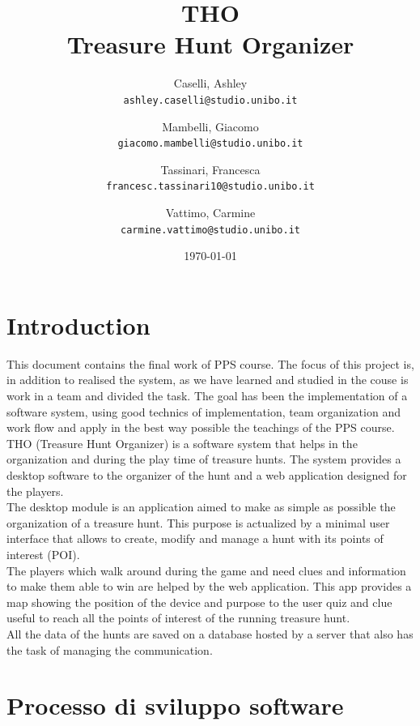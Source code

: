 \documentclass[12pt, english]{report}
\title{\textbf{THO\\Treasure Hunt Organizer}}
\author{
	Caselli, Ashley\\
	\texttt{ashley.caselli@studio.unibo.it}
	\and
	Mambelli, Giacomo\\
	\texttt{giacomo.mambelli@studio.unibo.it}
	\and
	Tassinari, Francesca\\
	\texttt{francesc.tassinari10@studio.unibo.it}
	\and
	Vattimo, Carmine\\
	\texttt{carmine.vattimo@studio.unibo.it}
}
\date{\today}
\begin{document}
\maketitle
\newpage
\tableofcontents
\newpage

\chapter{Introduction}
This document contains the final work of PPS course. The focus of this project is, in addition to realised the system, as we have learned and studied in the couse is work in a team and divided the task.
The goal has been the implementation of a software system, using good technics of implementation, team organization and work flow and apply in the best way possible the teachings of the PPS course.\\
THO (Treasure Hunt Organizer) is a software system that helps in the organization and during the play time of treasure hunts.
The system provides a desktop software to the organizer of the hunt and a web application designed for the players.\\
The desktop module is an application aimed to make as simple as possible the organization of a treasure hunt. This purpose is actualized by a minimal user interface that allows to create, modify and manage a hunt with its points of interest (POI).\\
The players which walk around during the game and need clues and information to make them able to win are helped by the web application. This app provides a map showing the position of the device and purpose to the user quiz and clue useful to reach all the points of interest of the running treasure hunt.\\
All the data of the hunts are saved on a database hosted by a server that also has the task of managing the communication.

\chapter{Processo di sviluppo software}
\end{document}
